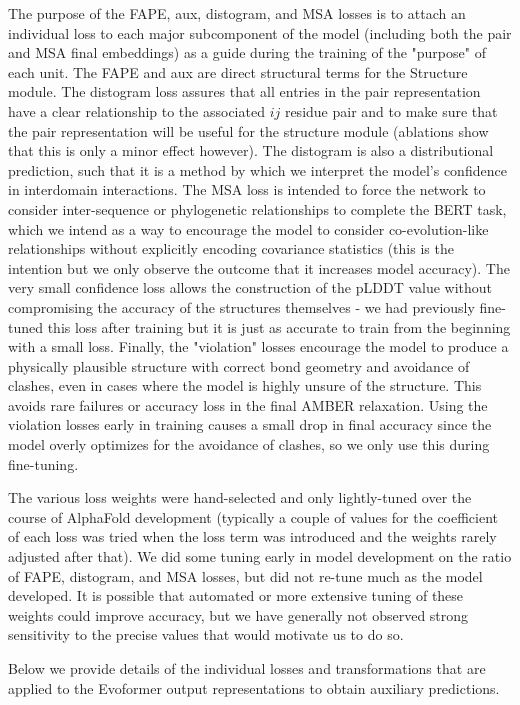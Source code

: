 \documentclass[10pt]{article}
\begin{document}
The purpose of the FAPE, aux, distogram, and MSA losses is to attach an individual loss to each major subcomponent of the model (including both the pair and MSA final embeddings) as a guide during the training of the "purpose" of each unit. The FAPE and aux are direct structural terms for the Structure module. The distogram loss assures that all entries in the pair representation have a clear relationship to the associated $i j$ residue pair and to make sure that the pair representation will be useful for the structure module (ablations show that this is only a minor effect however). The distogram is also a distributional prediction, such that it is a method by which we interpret the model's confidence in interdomain interactions. The MSA loss is intended to force the network to consider inter-sequence or phylogenetic relationships to complete the BERT task, which we intend as a way to encourage the model to consider co-evolution-like relationships without explicitly encoding covariance statistics (this is the intention but we only observe the outcome that it increases model accuracy). The very small confidence loss allows the construction of the pLDDT value without compromising the accuracy of the structures themselves - we had previously fine-tuned this loss after training but it is just as accurate to train from the beginning with a small loss. Finally, the "violation" losses encourage the model to produce a physically plausible structure with correct bond geometry and avoidance of clashes, even in cases where the model is highly unsure of the structure. This avoids rare failures or accuracy loss in the final AMBER relaxation. Using the violation losses early in training causes a small drop in final accuracy since the model overly optimizes for the avoidance of clashes, so we only use this during fine-tuning.

The various loss weights were hand-selected and only lightly-tuned over the course of AlphaFold development (typically a couple of values for the coefficient of each loss was tried when the loss term was introduced and the weights rarely adjusted after that). We did some tuning early in model development on the ratio of FAPE, distogram, and MSA losses, but did not re-tune much as the model developed. It is possible that automated or more extensive tuning of these weights could improve accuracy, but we have generally not observed strong sensitivity to the precise values that would motivate us to do so.

Below we provide details of the individual losses and transformations that are applied to the Evoformer output representations to obtain auxiliary predictions.
\end{document}
